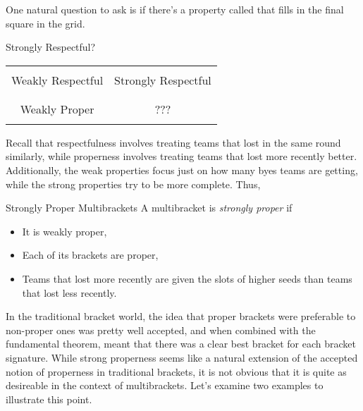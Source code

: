 {    One natural question to ask is if there's a property called that fills in the final square in the grid.

    \begin{figg}{Strongly Respectful?}{}
        \begin{center}
            \begin{tabular}{ | c | c |}
            \hline
            & \\
            Weakly Respectful & Strongly Respectful\\
            & \\
            \hline
            & \\
            Weakly Proper & ??? \\
            & \\
            \hline
            \end{tabular}
        \end{center}
    \end{figg}

    Recall that respectfulness involves treating teams that lost in the same round similarly, while properness involves treating teams that lost more recently better. Additionally, the weak properties focus just on how many byes teams are getting, while the strong properties try to be more complete. Thus,

    \begin{definition}{Strongly Proper Multibrackets}{}
        A multibracket is \textit{strongly proper} if
        \begin{itemize}
            \item It is weakly proper,
            \item Each of its brackets are proper,
            \item Teams that lost more recently are given the slots of higher seeds than teams that lost less recently.
        \end{itemize}
    \end{definition}

    In the traditional bracket world, the idea that proper brackets were preferable to non-proper ones was pretty well accepted, and when combined with the fundamental theorem, meant that there was a clear best bracket for each bracket signature. While strong properness seems like a natural extension of the accepted notion of properness in traditional brackets, it is not obvious that it is quite as desireable in the context of multibrackets. Let's examine two examples to illustrate this point.
    
}
